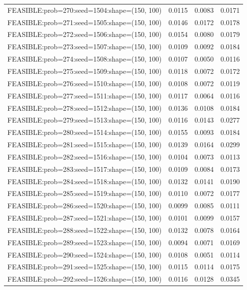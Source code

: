 \begin{longtable}{lccc}
FEASIBLE:prob=270:seed=1504:shape=(150, 100) &   0.0115 & 0.0083 & 0.0171 \\
FEASIBLE:prob=271:seed=1505:shape=(150, 100) &   0.0146 & 0.0172 & 0.0178 \\
FEASIBLE:prob=272:seed=1506:shape=(150, 100) &   0.0154 & 0.0080 & 0.0179 \\
FEASIBLE:prob=273:seed=1507:shape=(150, 100) &   0.0109 & 0.0092 & 0.0184 \\
FEASIBLE:prob=274:seed=1508:shape=(150, 100) &   0.0107 & 0.0050 & 0.0116 \\
FEASIBLE:prob=275:seed=1509:shape=(150, 100) &   0.0118 & 0.0072 & 0.0172 \\
FEASIBLE:prob=276:seed=1510:shape=(150, 100) &   0.0108 & 0.0072 & 0.0119 \\
FEASIBLE:prob=277:seed=1511:shape=(150, 100) &   0.0117 & 0.0064 & 0.0116 \\
FEASIBLE:prob=278:seed=1512:shape=(150, 100) &   0.0136 & 0.0108 & 0.0184 \\
FEASIBLE:prob=279:seed=1513:shape=(150, 100) &   0.0116 & 0.0143 & 0.0277 \\
FEASIBLE:prob=280:seed=1514:shape=(150, 100) &   0.0155 & 0.0093 & 0.0184 \\
FEASIBLE:prob=281:seed=1515:shape=(150, 100) &   0.0139 & 0.0164 & 0.0299 \\
FEASIBLE:prob=282:seed=1516:shape=(150, 100) &   0.0104 & 0.0073 & 0.0113 \\
FEASIBLE:prob=283:seed=1517:shape=(150, 100) &   0.0109 & 0.0084 & 0.0173 \\
FEASIBLE:prob=284:seed=1518:shape=(150, 100) &   0.0132 & 0.0141 & 0.0190 \\
FEASIBLE:prob=285:seed=1519:shape=(150, 100) &   0.0110 & 0.0072 & 0.0177 \\
FEASIBLE:prob=286:seed=1520:shape=(150, 100) &   0.0099 & 0.0085 & 0.0111 \\
FEASIBLE:prob=287:seed=1521:shape=(150, 100) &   0.0101 & 0.0099 & 0.0157 \\
FEASIBLE:prob=288:seed=1522:shape=(150, 100) &   0.0132 & 0.0078 & 0.0164 \\
FEASIBLE:prob=289:seed=1523:shape=(150, 100) &   0.0094 & 0.0071 & 0.0169 \\
FEASIBLE:prob=290:seed=1524:shape=(150, 100) &   0.0108 & 0.0051 & 0.0114 \\
FEASIBLE:prob=291:seed=1525:shape=(150, 100) &   0.0115 & 0.0114 & 0.0175 \\
FEASIBLE:prob=292:seed=1526:shape=(150, 100) &   0.0116 & 0.0128 & 0.0345 \\

\end{longtable}
